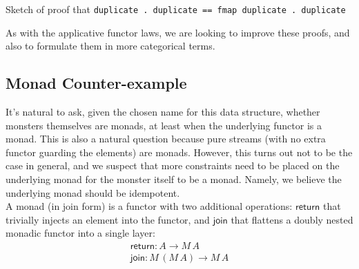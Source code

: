 Sketch of proof that \verb+duplicate . duplicate == fmap duplicate . duplicate+


As with the applicative functor laws, we are looking to improve these proofs, and also to formulate them in more categorical terms.


%

\subsection{Monad Counter-example}

It's natural to ask, given the chosen name for this data structure, whether monsters themselves are monads, at least when the underlying functor is a monad. This is also a natural question because pure streams (with no extra functor guarding the elements) are monads. However, this turns out not to be the case in general, and we suspect that more constraints need to be placed on the underlying monad for the monster itself to be a monad. Namely, we believe the underlying monad should be idempotent. \\

A monad (in join form) is a functor with two additional operations: $\mathsf{return}$ that trivially injects an element into the functor, and $\mathsf{join}$ that flattens a doubly nested monadic functor into a single layer: 
$$
\begin{array}{l}
\mathsf{return} : A \to M\,A\\
\mathsf{join} : M\,(M\,A) \to M\,A
\end{array}
$$

